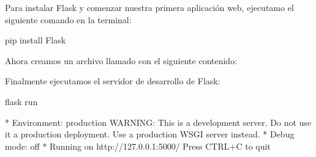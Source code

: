 \documentclass[a5paper,9pt,spanish]{sphinxmanual}
\begin{document}
\sphinxAtStartPar
Para instalar Flask y comenzar nuestra primera aplicación web,
ejecutamo el siguiente comando en la terminal:

\begin{sphinxVerbatim}[commandchars=\\\{\}]
pip install Flask
\end{sphinxVerbatim}

\sphinxAtStartPar
Ahora creamos un archivo llamado  con el siguiente contenido:

\begin{sphinxVerbatim}[commandchars=\\\{\}]
   

  

 
     

 
     
\end{sphinxVerbatim}

\sphinxAtStartPar
Finalmente ejecutamos el servidor de desarrollo de Flask:

\begin{sphinxVerbatim}[commandchars=\\\{\}]
flask run

* Environment: production
WARNING: This is a development server. Do not use it  a production deployment.
Use a production WSGI server instead.
* Debug mode: off
* Running on http://127.0.0.1:5000/ Press CTRL+C to quit
\end{sphinxVerbatim}
\end{document}
